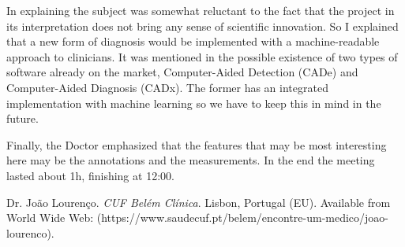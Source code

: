 \documentclass[a4paper, 11pt]{article}
\begin{document}
In explaining the subject was somewhat reluctant to the fact that the project in its interpretation does not bring any sense of scientific innovation. So I explained that a new form of diagnosis would be implemented with a machine-readable approach to clinicians. It was mentioned in the possible existence of two types of software already on the market, Computer-Aided Detection (CADe) and Computer-Aided Diagnosis (CADx). The former has an integrated implementation with machine learning so we have to keep this in mind in the future.

Finally, the Doctor emphasized that the features that may be most interesting here may be the annotations and the measurements. In the end the meeting lasted about 1h, finishing at 12:00.



\begin{thebibliography}{9}
  Dr. Jo\~{a}o Louren\c{c}o. \emph{CUF Bel\'{e}m Cl\'{i}nica}. Lisbon, Portugal (EU). Available from World Wide Web: (https://www.saudecuf.pt/belem/encontre-um-medico/joao-lourenco).
\end{thebibliography}
\end{document}
